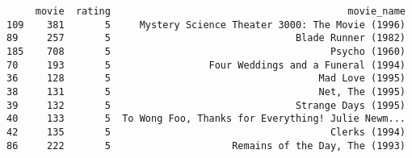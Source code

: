 \documentclass[12pt,fleqn]{article}\usepackage{../common}
\begin{document}
\begin{verbatim}
     movie  rating                                         movie_name
109    381       5     Mystery Science Theater 3000: The Movie (1996)
89     257       5                                Blade Runner (1982)
185    708       5                                      Psycho (1960)
70     193       5                 Four Weddings and a Funeral (1994)
36     128       5                                    Mad Love (1995)
38     131       5                                    Net, The (1995)
39     132       5                                Strange Days (1995)
40     133       5  To Wong Foo, Thanks for Everything! Julie Newm...
42     135       5                                      Clerks (1994)
86     222       5                     Remains of the Day, The (1993)
\end{verbatim}
\end{document}
